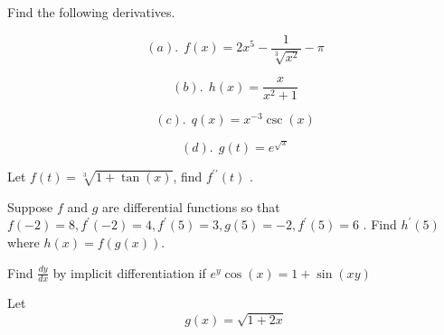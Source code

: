\documentclass[11pt]{exam}
\begin{document}
\begin{questions}


\addpoints
\question[20] 
Find the following derivatives.  %

\begin{minipage}{.5\linewidth}
\begin{equation*}
(a). \ \ f(x)=2x^{5}-\frac{1}{\sqrt[3]{x^{2}}}-\pi
\end{equation*}
\end{minipage}%
\begin{minipage}{.5\linewidth}
\begin{equation*}
(b). \ \ h(x)=\frac{x}{x^{2}+1}
\end{equation*}
\end{minipage}



\vfill

\begin{minipage}{.5\linewidth}
\begin{equation*}
(c). \ \ q(x)=x^{-3}\csc{(x)}
\end{equation*}
\end{minipage}%
\begin{minipage}{.5\linewidth}
\begin{equation*}
(d). \ \ g(t)=e^{\sqrt{x}}
\end{equation*}
\end{minipage}
\vfill





\addpoints
\question[8] Let $f(t)=\sqrt[3]{1+\tan{(x)}}$, find $f^{\prime\prime}(t)$ .  %
\vfill

\addpoints
\question[8] Suppose $f$ and $g$ are differential functions so that $f(-2)=8, f^{\prime}(-2)=4, f^{\prime}(5)=3, g(5)=-2, f^{\prime}(5)=6$ . Find $h^{\prime}(5)$ where $h(x)=f(g(x))$.

\vfill



\newpage
\addpoints
\question[15] 
Find $\frac{dy}{dx}$ by implicit differentiation if $e^{y}\cos{(x)}=1+\sin{(xy)}$
\vfill


\addpoints
\question[15] 
Let 
\[
g(x)=\sqrt{1+2x}     %
\]
\begin{parts}

\end{parts}
\end{questions}
\end{document}
